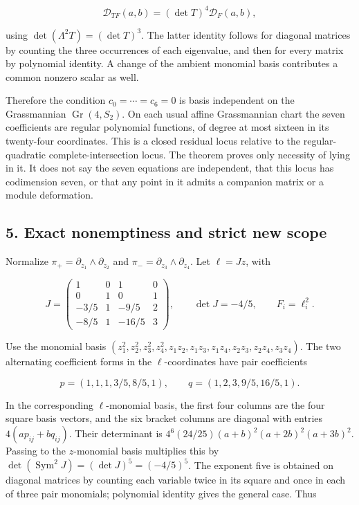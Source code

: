 \[
 \mathcal D_{TF}(a,b)=(\det T)^4\mathcal D_F(a,b),
 \tag{E838.16}
\]

using \(\det(\Lambda^2T)=(\det T)^3\). The latter identity follows for
diagonal matrices by counting the three occurrences of each eigenvalue,
and then for every matrix by polynomial identity. A change of the
ambient monomial basis contributes a common nonzero scalar as well.

Therefore the condition \(c_0=\cdots=c_6=0\) is basis independent on the
Grassmannian \(\operatorname{Gr}(4,S_2)\). On each usual affine
Grassmannian chart the seven coefficients are regular polynomial
functions, of degree at most sixteen in its twenty-four coordinates.
This is a closed residual locus relative to the regular-quadratic
complete-intersection locus. The theorem proves only necessity of lying
in it. It does not say the seven equations are independent, that this
locus has codimension seven, or that any point in it admits a companion
matrix or a module deformation.

\subsection{5. Exact nonemptiness and strict new
scope}\label{SF-E838:exact-nonemptiness-and-strict-new-scope}

Normalize \(\pi_+=\partial_{z_1}\wedge\partial_{z_2}\) and
\(\pi_-=\partial_{z_3}\wedge\partial_{z_4}\). Let \(\ell=Jz\), with

\[
 J=\begin{pmatrix}
 1&0&1&0\\
 0&1&0&1\\
 -3/5&1&-9/5&2\\
 -8/5&1&-16/5&3
 \end{pmatrix},\qquad
 \det J=-4/5,\qquad F_i=\ell_i^2.
 \tag{E838.17}
\]

Use the monomial basis
\((z_1^2,z_2^2,z_3^2,z_4^2,z_1z_2,z_1z_3,z_1z_4,z_2z_3,z_2z_4,z_3z_4)\).
The two alternating coefficient forms in the \(\ell\)-coordinates have
pair coefficients

\[
 p=(1,1,1,3/5,8/5,1),\qquad
 q=(1,2,3,9/5,16/5,1).
 \tag{E838.18}
\]

In the corresponding \(\ell\)-monomial basis, the first four columns are
the four square basis vectors, and the six bracket columns are diagonal
with entries \(4(ap_{ij}+bq_{ij})\). Their determinant is
\(4^6(24/25)(a+b)^2(a+2b)^2(a+3b)^2\). Passing to the \(z\)-monomial
basis multiplies this by
\(\det(\operatorname{Sym}^2J)=(\det J)^5=(-4/5)^5\). The exponent five
is obtained on diagonal matrices by counting each variable twice in its
square and once in each of three pair monomials; polynomial identity
gives the general case. Thus

